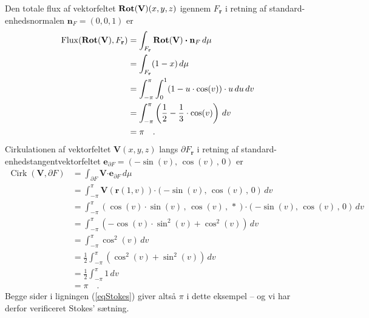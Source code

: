\begin{example}
Den totale flux af vektorfeltet $\operatorname{\mathbf{Rot}}(\mathbf{V})(x,y,z)$ igennem $F_{\mathbf{r}}$ i retning af standard-enhedsnormalen $\mathbf{n}_{F} = (0,0,1)$ er
\begin{equation}
\begin{aligned}
\operatorname{Flux}(\operatorname{\mathbf{Rot}}(\mathbf{V}), F_{\mathbf{r}} ) &= \int_{F_{\mathbf{r}}}\operatorname{\mathbf{Rot}}(\mathbf{V}) \bm{\cdot} \mathbf{n}_{F} \, d\mu \\
&= \int_{F_{\mathbf{r}}} (1- x) \, d\mu \\
&= \int_{-\pi}^{\pi}\int_{0}^{1}(1 - u\cdot \cos(v)) \cdot u \, du \, dv \\
&= \int_{-\pi}^{\pi}\left(\frac{1}{2} - \frac{1}{3}\cdot \cos(v)\right)\, dv \\
&= \pi \quad .
\end{aligned}
\end{equation}
Cirkulationen af vektorfeltet $\mathbf{V}(x,y,z)$ langs $\partial F_{\mathbf{r}}$ i retning af stan\-dard-en\-heds\-tan\-gent\-vek\-to\-rfeltet $\mathbf{e}_{\partial F} = (-\sin(v), \, \cos(v)\, , \, 0 )$ er
\begin{equation}
\begin{aligned}
\operatorname{Cirk}(\mathbf{V}, \partial F) &= \int_{\partial F}\mathbf{V} \bm{\cdot} \mathbf{e}_{\partial F} \, d\mu \\
&= \int_{-\pi}^{\pi}\mathbf{V}(\mathbf{r}(1, v)) \bm{\cdot}  (-\sin(v),  \, \cos(v)\, , \, 0 ) \, dv \\
&= \int_{-\pi}^{\pi} (\cos(v)\cdot \sin(v)\, , \, \cos(v) \, , \, * ) \bm{\cdot}  (-\sin(v), \, \cos(v)\, , \, 0 ) \, dv \\
&= \int_{-\pi}^{\pi} (- \cos(v)\cdot \sin^{2}(v) + \cos^{2}(v))  \, dv \\
&= \int_{-\pi}^{\pi} \cos^{2}(v)  \, dv \\
&= \frac{1}{2}\int_{-\pi}^{\pi} \left( \cos^{2}(v) + \sin^{2}(v)\right) \, dv \\
&= \frac{1}{2}\int_{-\pi}^{\pi} 1 \, dv \\
&= \pi \quad .
\end{aligned}
\end{equation}
Begge sider i ligningen (\ref{eqStokes}) giver altså $\pi$ i dette eksempel -- og vi har derfor verificeret Stokes' sætning.
\end{example}



